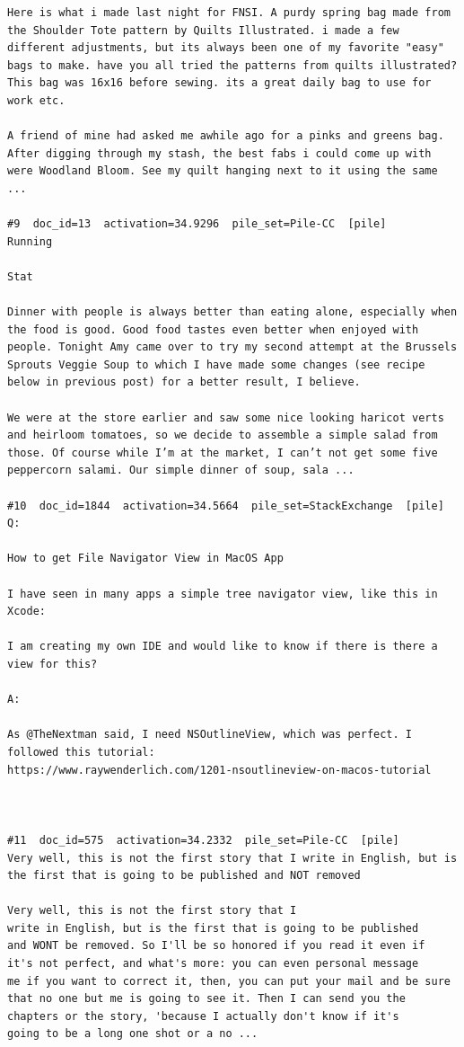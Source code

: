 \begin{verbatim}
Here is what i made last night for FNSI. A purdy spring bag made from the Shoulder Tote pattern by Quilts Illustrated. i made a few different adjustments, but its always been one of my favorite "easy" bags to make. have you all tried the patterns from quilts illustrated? This bag was 16x16 before sewing. its a great daily bag to use for work etc.

A friend of mine had asked me awhile ago for a pinks and greens bag. After digging through my stash, the best fabs i could come up with were Woodland Bloom. See my quilt hanging next to it using the same ...

#9  doc_id=13  activation=34.9296  pile_set=Pile-CC  [pile]
Running

Stat

Dinner with people is always better than eating alone, especially when the food is good. Good food tastes even better when enjoyed with people. Tonight Amy came over to try my second attempt at the Brussels Sprouts Veggie Soup to which I have made some changes (see recipe below in previous post) for a better result, I believe.

We were at the store earlier and saw some nice looking haricot verts and heirloom tomatoes, so we decide to assemble a simple salad from those. Of course while I’m at the market, I can’t not get some five peppercorn salami. Our simple dinner of soup, sala ...

#10  doc_id=1844  activation=34.5664  pile_set=StackExchange  [pile]
Q:

How to get File Navigator View in MacOS App

I have seen in many apps a simple tree navigator view, like this in Xcode:

I am creating my own IDE and would like to know if there is there a view for this?

A:

As @TheNextman said, I need NSOutlineView, which was perfect. I followed this tutorial:
https://www.raywenderlich.com/1201-nsoutlineview-on-macos-tutorial



#11  doc_id=575  activation=34.2332  pile_set=Pile-CC  [pile]
Very well, this is not the first story that I write in English, but is the first that is going to be published and NOT removed

Very well, this is not the first story that I
write in English, but is the first that is going to be published
and WONT be removed. So I'll be so honored if you read it even if
it's not perfect, and what's more: you can even personal message
me if you want to correct it, then, you can put your mail and be sure
that no one but me is going to see it. Then I can send you the
chapters or the story, 'because I actually don't know if it's
going to be a long one shot or a no ...


\end{verbatim}

